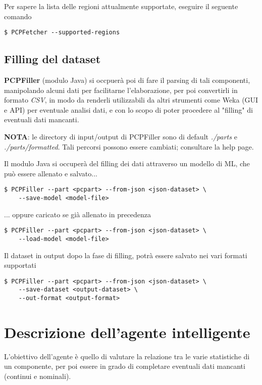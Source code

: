 \documentclass[12pt]{report}
\begin{document}
Per sapere la lista delle regioni attualmente supportate, eseguire il seguente comando
\begin{lstlisting}
$ PCPFetcher --supported-regions
\end{lstlisting}

\newpage
\subsection{Filling del dataset}

\textbf{PCPFiller} (modulo Java) si occpuerà poi di fare il parsing di tali componenti, manipolando
alcuni dati per facilitarne l'elaborazione, per poi convertirli in formato \textit{CSV}, in modo da
renderli utilizzabili da altri strumenti come Weka (GUI e API) per eventuale analisi dati, e con lo
scopo di poter procedere al "filling" di eventuali dati mancanti.

\textbf{NOTA}: le directory di input/output di PCPFiller sono di default \textit{./parts} e
\textit{./parts/formatted}. Tali percorsi possono essere cambiati; consultare la help page.

Il modulo Java si occuperà del filling dei dati attraverso un modello di ML, che può essere allenato e salvato...
\begin{lstlisting}
$ PCPFiller --part <pcpart> --from-json <json-dataset> \
	--save-model <model-file>
\end{lstlisting}

... oppure caricato se già allenato in precedenza
\begin{lstlisting}
$ PCPFiller --part <pcpart> --from-json <json-dataset> \
	--load-model <model-file>
\end{lstlisting}

Il dataset in output dopo la fase di filling, potrà essere salvato nei vari formati supportati
\begin{lstlisting}
$ PCPFiller --part <pcpart> --from-json <json-dataset> \
	--save-dataset <output-dataset> \
	--out-format <output-format>
\end{lstlisting}

\newpage
\section{Descrizione dell'agente intelligente}

L'obiettivo dell'agente è quello di valutare la relazione tra le varie statistiche di un componente,
per poi essere in grado di completare eventuali dati mancanti (continui e nominali).
\end{document}
